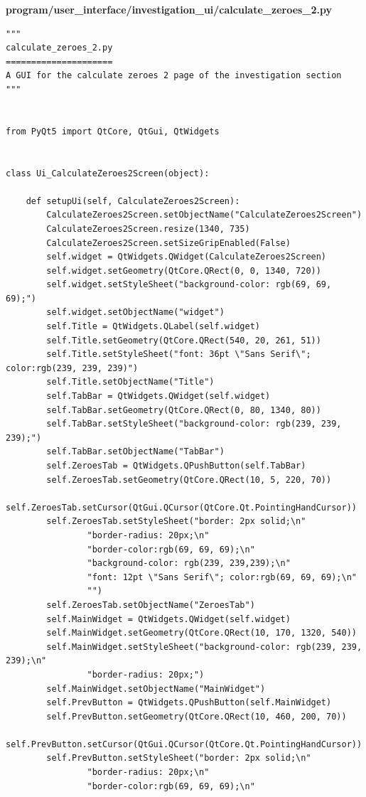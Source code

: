 \documentclass[12pt]{article}
\begin{document}
\textbf{program/user\_interface/investigation\_ui/calculate\_zeroes\_2.py}
\begin{lstlisting}
"""
calculate_zeroes_2.py
=====================
A GUI for the calculate zeroes 2 page of the investigation section
"""


from PyQt5 import QtCore, QtGui, QtWidgets


class Ui_CalculateZeroes2Screen(object):

    def setupUi(self, CalculateZeroes2Screen):
        CalculateZeroes2Screen.setObjectName("CalculateZeroes2Screen")
        CalculateZeroes2Screen.resize(1340, 735)
        CalculateZeroes2Screen.setSizeGripEnabled(False)
        self.widget = QtWidgets.QWidget(CalculateZeroes2Screen)
        self.widget.setGeometry(QtCore.QRect(0, 0, 1340, 720))
        self.widget.setStyleSheet("background-color: rgb(69, 69, 69);")
        self.widget.setObjectName("widget")
        self.Title = QtWidgets.QLabel(self.widget)
        self.Title.setGeometry(QtCore.QRect(540, 20, 261, 51))
        self.Title.setStyleSheet("font: 36pt \"Sans Serif\"; color:rgb(239, 239, 239)")
        self.Title.setObjectName("Title")
        self.TabBar = QtWidgets.QWidget(self.widget)
        self.TabBar.setGeometry(QtCore.QRect(0, 80, 1340, 80))
        self.TabBar.setStyleSheet("background-color: rgb(239, 239, 239);")
        self.TabBar.setObjectName("TabBar")
        self.ZeroesTab = QtWidgets.QPushButton(self.TabBar)
        self.ZeroesTab.setGeometry(QtCore.QRect(10, 5, 220, 70))
        self.ZeroesTab.setCursor(QtGui.QCursor(QtCore.Qt.PointingHandCursor))
        self.ZeroesTab.setStyleSheet("border: 2px solid;\n"
                "border-radius: 20px;\n"
                "border-color:rgb(69, 69, 69);\n"
                "background-color: rgb(239, 239,239);\n"
                "font: 12pt \"Sans Serif\"; color:rgb(69, 69, 69);\n"
                "")
        self.ZeroesTab.setObjectName("ZeroesTab")
        self.MainWidget = QtWidgets.QWidget(self.widget)
        self.MainWidget.setGeometry(QtCore.QRect(10, 170, 1320, 540))
        self.MainWidget.setStyleSheet("background-color: rgb(239, 239, 239);\n"
                "border-radius: 20px;")
        self.MainWidget.setObjectName("MainWidget")
        self.PrevButton = QtWidgets.QPushButton(self.MainWidget)
        self.PrevButton.setGeometry(QtCore.QRect(10, 460, 200, 70))
        self.PrevButton.setCursor(QtGui.QCursor(QtCore.Qt.PointingHandCursor))
        self.PrevButton.setStyleSheet("border: 2px solid;\n"
                "border-radius: 20px;\n"
                "border-color:rgb(69, 69, 69);\n"

\end{lstlisting}
\end{document}

